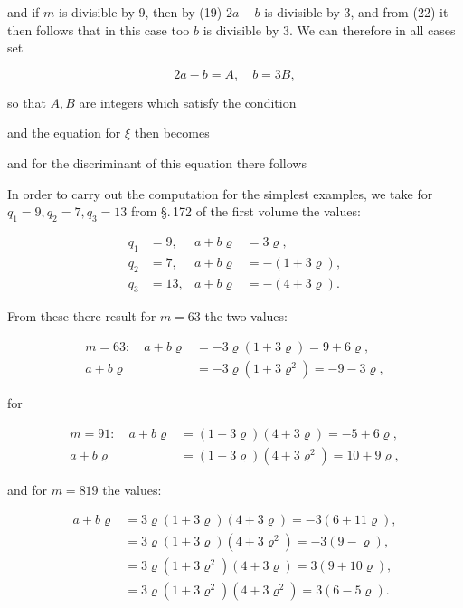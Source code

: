 
and if $m$ is divisible by 9, then by (19) $2a - b$ is divisible by 3,
and from (22) it then follows that in this case too $b$ is divisible by 3.
We can therefore in all cases set

\[ 2a - b = A, \quad b = 3B, \]

so that $A, B$ are integers which satisfy the condition


and the equation for $\xi$ then becomes


and for the discriminant of this equation there follows


In order to carry out the computation for the simplest examples, we take for
$q_1 = 9, q_2 = 7, q_3 = 13$ from \S.\,172 of the first volume the values:

\[ \begin{aligned}
q_1 &= 9, & a + b\varrho &= 3\varrho, \\
q_2 &= 7, & a + b\varrho &= -(1 + 3\varrho), \\
q_3 &= 13, & a + b\varrho &= -(4 + 3\varrho).
\end{aligned} \]

From these there result for $m = 63$ the two values:

\[ \begin{aligned}
m = 63:\quad a + b\varrho &= -3\varrho(1 + 3\varrho) = 9 + 6\varrho, \\
a + b\varrho &= -3\varrho(1 + 3\varrho^2) = -9 - 3\varrho,
\end{aligned} \]

for

\[ \begin{aligned}
m = 91:\quad a + b\varrho &= (1 + 3\varrho)(4 + 3\varrho) = -5 + 6\varrho, \\
a + b\varrho &= (1 + 3\varrho)(4 + 3\varrho^2) = 10 + 9\varrho,
\end{aligned} \]

and for $m = 819$ the values:

\[ \begin{aligned}
a + b\varrho &= 3\varrho(1 + 3\varrho)(4 + 3\varrho) = -3(6 + 11\varrho), \\
&= 3\varrho(1 + 3\varrho)(4 + 3\varrho^2) = -3(9 - \varrho), \\
&= 3\varrho(1 + 3\varrho^2)(4 + 3\varrho) = 3(9 + 10\varrho), \\
&= 3\varrho(1 + 3\varrho^2)(4 + 3\varrho^2) = 3(6 - 5\varrho).
\end{aligned} \]

